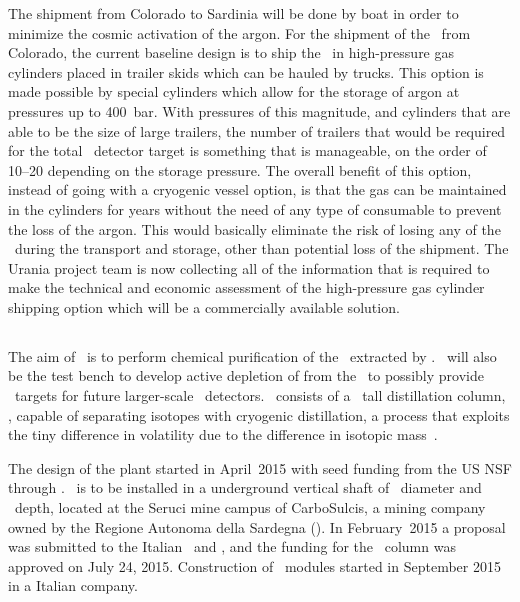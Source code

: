 The shipment from Colorado to Sardinia will be done by boat in order to minimize the cosmic activation of the argon. For the shipment of the \UAr\ from Colorado, the current baseline design is to ship the \UAr\ in high-pressure gas cylinders placed in trailer skids which can be hauled by trucks.  This option is made possible by special cylinders which allow for the storage of argon at pressures up to \SI{400}{\bar}.  With pressures of this magnitude, and cylinders that are able to be the size of large trailers, the number of trailers that would be required for the total \DSks\ detector target is something that is manageable, on the order of \numrange{10}{20} depending on the storage pressure.  The overall benefit of this option, instead of going with a cryogenic vessel option, is that the gas can be maintained in the cylinders for years without the need of any type of consumable to prevent the loss of the argon.  This would basically eliminate the risk of losing any of the \UAr\ during the transport and storage, other than potential loss of the shipment.  The Urania project team is now collecting all of the information that is required to make the technical and economic assessment of the high-pressure gas cylinder shipping option which will be a commercially available solution.


\subsection{\Aria}
The aim of  \Aria\ is to perform chemical purification of the \UAr\ extracted by \Urania.  \Aria\ will also be the test bench to develop active depletion of  from the \UAr\ to possibly provide \DAr\ targets for future larger-scale \LAr\ detectors.  \Aria\ consists of a \AriaSeruciHeight\ tall distillation column, \SeruciOne, capable of separating isotopes with cryogenic distillation, a process that exploits the tiny difference in volatility due to the difference in isotopic mass~\cite{Lindemann:1919bq,Urey:1932gl,deBoer:1948br,deBoer:1948fc,deBoer:1939cs,Bigeleisen:1961cm}.

The design of the plant started in April~2015 with seed funding from the US NSF through .  \Aria\ is to be installed in a underground  vertical shaft of  \AriaMonteSinniDiameter\ diameter and \AriaSeruciHeight\ depth,  located at the Seruci mine campus of CarboSulcis, a mining company owned by the Regione Autonoma della Sardegna (\RAS).  In February~2015 a proposal was submitted to the Italian \INFN\ and \RAS, and the funding for the \SeruciOne\ column was approved on July 24, 2015.  Construction of \SeruciOne\ modules started in September 2015 in a Italian company.    

